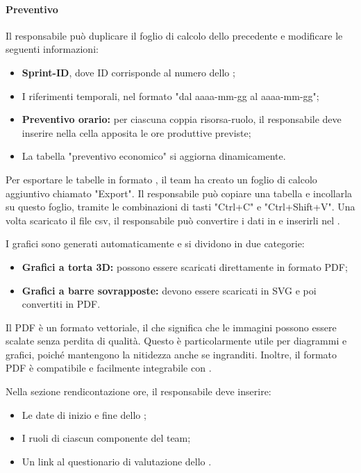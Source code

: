 \paragraph*{Preventivo}
Il responsabile può duplicare il foglio di calcolo dello  precedente e modificare le seguenti informazioni:
\begin{itemize}
  \item \textbf{Sprint-ID}, dove ID corrisponde al numero dello ;
  \item I riferimenti temporali, nel formato "dal aaaa-mm-gg al aaaa-mm-gg";
  \item \textbf{Preventivo orario:} per ciascuna coppia risorsa-ruolo, il responsabile deve inserire nella cella apposita le ore produttive previste;
  \item La tabella "preventivo economico" si aggiorna dinamicamente.
\end{itemize}
\par Per esportare le tabelle in formato , il team ha creato un foglio di calcolo aggiuntivo chiamato "Export". Il responsabile può copiare una tabella e incollarla su questo foglio, tramite le combinazioni di tasti "Ctrl+C" e "Ctrl+Shift+V". Una volta scaricato il file csv, il responsabile può convertire i dati in  e inserirli nel \PdP.
\par I grafici sono generati automaticamente e si dividono in due categorie:
\begin{itemize}
  \item \textbf{Grafici a torta 3D:} possono essere scaricati direttamente in formato PDF;
  \item \textbf{Grafici a barre sovrapposte:} devono essere scaricati in SVG e poi convertiti in PDF.
\end{itemize}
\par Il PDF è un formato vettoriale, il che significa che le immagini possono essere scalate senza perdita di qualità. Questo è particolarmente utile per diagrammi e grafici, poiché mantengono la nitidezza anche se ingranditi. Inoltre, il formato PDF è compatibile e facilmente integrabile con .
\par Nella sezione rendicontazione ore, il responsabile deve inserire:
\begin{itemize}
  \item Le date di inizio e fine dello ;
  \item I ruoli di ciascun componente del team;
  \item Un link al questionario di valutazione dello .
\end{itemize}
